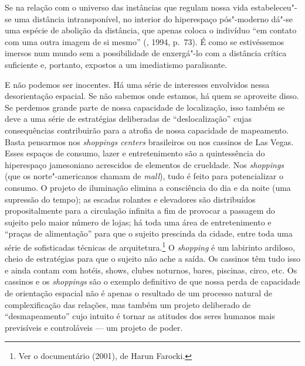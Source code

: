 Se na relação com o universo das instâncias que regulam nossa vida
estabeleceu"-se uma distância intransponível, no interior do hiperespaço
pós"-moderno dá"-se uma espécie de abolição da distância, que apenas
coloca o indivíduo ``em contato com uma outra imagem de si mesmo''
(, 1994, p.~73). É como se estivéssemos imersos num mundo sem a
possibilidade de enxergá"-lo com a distância crítica suficiente e,
portanto, expostos a um imediatismo paralisante.

E não podemos ser inocentes. Há uma série de interesses envolvidos nessa
desorientação espacial. Se não sabemos onde estamos, há quem se
aproveite disso. Se perdemos grande parte de nossa capacidade de
localização, isso também se deve a uma série de estratégias deliberadas
de ``deslocalização'' cujas consequências contribuirão para a atrofia de
nossa capacidade de mapeamento. Basta pensarmos nos \emph{shoppings
centers} brasileiros ou nos cassinos de Las Vegas. Esses espaços de
consumo, lazer e entretenimento são a quintessência do hiperespaço
jamesoniano acrescidos de elementos de crueldade. Nos \emph{shoppings} (que os
norte"-americanos chamam de \emph{mall}), tudo é feito para potencializar
o consumo. O projeto de iluminação elimina a consciência do dia e da
noite (uma supressão do tempo); as escadas rolantes e elevadores são
distribuídos propositalmente para a circulação infinita a fim de
provocar a passagem do sujeito pelo maior número de lojas; há toda uma
área de entretenimento e ``praças de alimentação'' para que o sujeito
prescinda da cidade, entre toda uma série de sofisticadas técnicas de
arquitetura.\footnote{Ver o documentário {} (2001), de Harun Farocki.} O \emph{shopping} é um labirinto
ardiloso, cheio de estratégias para que o sujeito não ache a saída. Os
cassinos têm tudo isso e ainda contam com hotéis, shows, clubes
noturnos, bares, piscinas, circo, etc. Os cassinos e os \emph{shoppings} são o
exemplo definitivo de que nossa perda de capacidade de orientação
espacial não é apenas o resultado de um processo natural de
complexificação das relações, mas também um projeto deliberado de
``desmapeamento'' cujo intuito é tornar as atitudes dos seres humanos
mais previsíveis e controláveis --- um projeto de poder.

